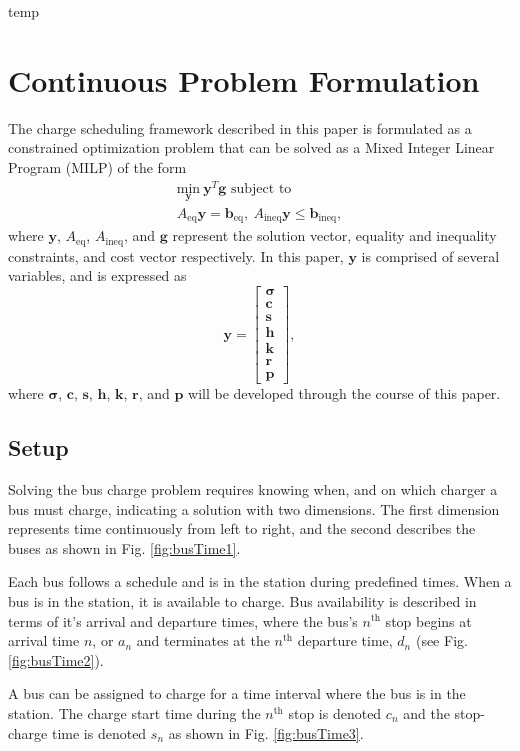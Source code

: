 \newpage temp \newpage
\section{Continuous Problem Formulation}
The charge scheduling framework described in this paper is formulated as a constrained optimization problem that can be solved as a Mixed Integer Linear Program (MILP) of the form
\begin{equation}\begin{matrix}
	\underset{\mathbf{y}}{\text{min}} \ \mathbf{y}^T\mathbf{g} \text{ subject to } \\
	A_{\text{eq}}\mathbf{y} = \mathbf{b}_{\text{eq}}, \ A_{\text{ineq}}\mathbf{y} \le \mathbf{b}_{\text{ineq}},
\end{matrix} \end{equation}
where $\mathbf{y}$, $A_{\text{eq}}$, $A_{\text{ineq}}$, and $\mathbf{g}$ represent the solution vector, equality and inequality constraints, and cost vector respectively. In this paper, $\mathbf{y}$ is comprised of several variables, and is expressed as 
\begin{equation}
	\mathbf{y} = \begin{bmatrix}\mathbf{\sigma} \\ \mathbf{c} \\ \mathbf{s} \\ \mathbf{h} \\ \mathbf{k} \\ \mathbf{r} \\ \mathbf{p}\end{bmatrix},
\end{equation}
where $\mathbf{\sigma}$, $\mathbf{c}$, $\mathbf{s}$, $\mathbf{h}$, $\mathbf{k}$, $\mathbf{r}$, and $\mathbf{p}$ will be developed through the course of this paper.
\subsection{Setup}
\par Solving the bus charge problem requires knowing when, and on which charger a bus must charge, indicating a solution with two dimensions.  The first dimension represents time continuously from left to right, and the second describes the buses as shown in Fig. \ref{fig:busTime1}.

\par Each bus follows a schedule and is in the station during predefined times. When a bus is in the station, it is available to charge.  Bus availability is described in terms of it's arrival and departure times, where the bus's $n^{\text{th}}$ stop begins at arrival time $n$, or $a_n$ and terminates at the $n^{\text{th}}$ departure time, $d_n$ (see Fig. \ref{fig:busTime2}). 

\par A bus can be assigned to charge for a time interval where the bus is in the station. The charge start time during the $n^{\text{th}}$ stop is denoted $c_n$ and the stop-charge time is denoted $s_n$ as shown in Fig. \ref{fig:busTime3}. 

